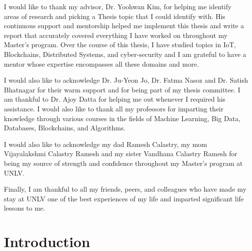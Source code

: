\documentclass[11pt,openright]{report}
\begin{document}
\begin{thesisacknowledgments}
I would like to thank my advisor, Dr. Yoohwan Kim, for helping me identify areas of research and picking a Thesis topic that I could identify with. His continuous support and mentorship helped me implement this thesis and write a report that accurately covered everything I have worked on throughout my Master's program. Over the course of this thesis, I have studied topics in IoT, Blockchains, Distributed Systems, and cyber-security and I am grateful to have a mentor whose expertise encompasses all these domains and more.

I would also like to acknowledge  Dr. Ju-Yeon Jo, Dr. Fatma Nasoz and Dr. Satish Bhatnagar for their warm support and for being part of my thesis committee. I am thankful to Dr. Ajoy Datta for helping me out whenever I required his assistance. I would also like to thank all my professors for imparting their knowledge through various courses in the fields of Machine Learning, Big Data, Databases, Blockchains, and Algorithms.

I would also like to acknowledge my dad Ramesh Calastry, my mom Vijayalakshmi Calastry Ramesh and my sister Vandhana Calastry Ramesh for being my source of strength and confidence throughout my Master's program at UNLV.

Finally, I am thankful to all my friends, peers, and colleagues who have made my stay at UNLV one of the best experiences of my life and imparted significant life lessons to me. 
\end{thesisacknowledgments}

\pagestyle{plain}

\tableofcontents
\clearpage
\listoftables
\clearpage
\listoffigures
\clearpage
\listofalgorithms
\clearpage

\chapter{Introduction}\label{chapter:introduction} 
\end{document}
